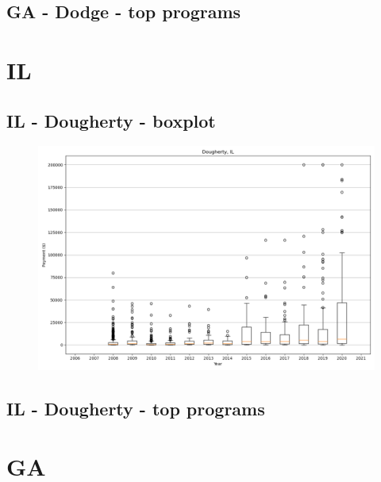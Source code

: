 \subsection*{GA - Dodge - top programs}

\newpage
\section*{IL}
\subsection*{IL - Dougherty - boxplot}
\begin{figure}[h]
\centering
\includegraphics[width=7in]{../output/boxplots/counties/Dougherty-IL_boxplot.png}
\end{figure}


\subsection*{IL - Dougherty - top programs}

\newpage
\section*{GA}
